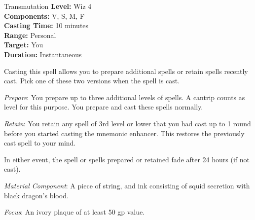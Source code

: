 {Transmutation}
{
	\textbf{Level:}
	Wiz 4\\
	\textbf{Components:}
	V, S, M, F\\
	\textbf{Casting Time:}
	10 minutes\\
	\textbf{Range:}
	Personal\\
	\textbf{Target:}
	You\\
	\textbf{Duration:}
	Instantaneous\\
}
{
	Casting this spell allows you to prepare additional spells or retain spells recently cast. Pick one of these two versions when the spell is cast.

	\textit{Prepare}:
	You prepare up to three additional levels of spells. A cantrip counts as \onehalf level for this purpose. You prepare and cast these spells normally.

	\textit{Retain}:
	You retain any spell of 3rd level or lower that you had cast up to 1 round before you started casting the mnemonic enhancer. This restores the previously cast spell to your mind.

	In either event, the spell or spells prepared or retained fade after 24 hours (if not cast).

	\textit{Material Component}:
	A piece of string, and ink consisting of squid secretion with black dragon's blood.

	\textit{Focus}:
	An ivory plaque of at least 50 gp value.

}
